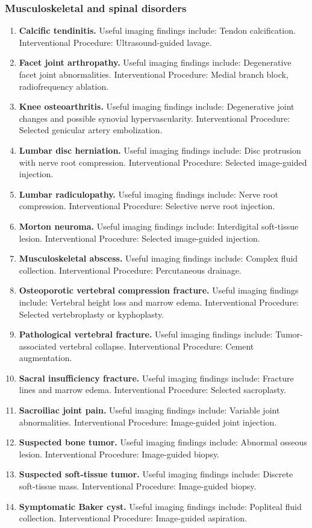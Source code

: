 \subsubsection{Musculoskeletal and spinal disorders}
\begin{enumerate}[leftmargin=*,itemsep=0.45em,topsep=0.4em]
\item \textbf{Calcific tendinitis.} Useful imaging findings include: Tendon calcification. Interventional Procedure: Ultrasound-guided lavage.
\item \textbf{Facet joint arthropathy.} Useful imaging findings include: Degenerative facet joint abnormalities. Interventional Procedure: Medial branch block, radiofrequency ablation.
\item \textbf{Knee osteoarthritis.} Useful imaging findings include: Degenerative joint changes and possible synovial hypervascularity. Interventional Procedure: Selected genicular artery embolization.
\item \textbf{Lumbar disc herniation.} Useful imaging findings include: Disc protrusion with nerve root compression. Interventional Procedure: Selected image-guided injection.
\item \textbf{Lumbar radiculopathy.} Useful imaging findings include: Nerve root compression. Interventional Procedure: Selective nerve root injection.
\item \textbf{Morton neuroma.} Useful imaging findings include: Interdigital soft-tissue lesion. Interventional Procedure: Selected image-guided injection.
\item \textbf{Musculoskeletal abscess.} Useful imaging findings include: Complex fluid collection. Interventional Procedure: Percutaneous drainage.
\item \textbf{Osteoporotic vertebral compression fracture.} Useful imaging findings include: Vertebral height loss and marrow edema. Interventional Procedure: Selected vertebroplasty or kyphoplasty.
\item \textbf{Pathological vertebral fracture.} Useful imaging findings include: Tumor-associated vertebral collapse. Interventional Procedure: Cement augmentation.
\item \textbf{Sacral insufficiency fracture.} Useful imaging findings include: Fracture lines and marrow edema. Interventional Procedure: Selected sacroplasty.
\item \textbf{Sacroiliac joint pain.} Useful imaging findings include: Variable joint abnormalities. Interventional Procedure: Image-guided joint injection.
\item \textbf{Suspected bone tumor.} Useful imaging findings include: Abnormal osseous lesion. Interventional Procedure: Image-guided biopsy.
\item \textbf{Suspected soft-tissue tumor.} Useful imaging findings include: Discrete soft-tissue mass. Interventional Procedure: Image-guided biopsy.
\item \textbf{Symptomatic Baker cyst.} Useful imaging findings include: Popliteal fluid collection. Interventional Procedure: Image-guided aspiration.
\end{enumerate}

